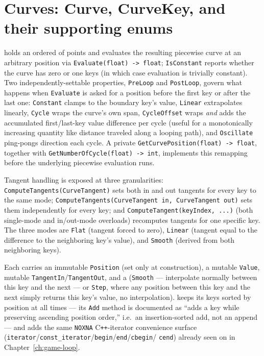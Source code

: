 \section{Curves: Curve, CurveKey, and their supporting enums}

 holds an ordered  of  points
and evaluates the resulting piecewise curve at an arbitrary position via
\texttt{Evaluate(float) -> float}; \texttt{IsConstant} reports whether the curve has zero or
one keys (in which case evaluation is trivially constant). Two independently-settable
 properties, \texttt{PreLoop} and \texttt{PostLoop}, govern what
happens when \texttt{Evaluate} is asked for a position before the first key or after the
last one: \texttt{Constant} clamps to the boundary key's value, \texttt{Linear} extrapolates
linearly, \texttt{Cycle} wraps the curve's own span, \texttt{CycleOffset} wraps \emph{and}
adds the accumulated first/last-key value difference per cycle (useful for a monotonically
increasing quantity like distance traveled along a looping path), and \texttt{Oscillate}
ping-pongs direction each cycle. A private \texttt{GetCurvePosition(float) -> float},
together with \texttt{GetNumberOfCycle(float) -> int}, implements this remapping before the
underlying piecewise evaluation runs.

Tangent handling is exposed at three granularities: \texttt{ComputeTangents(CurveTangent)}
sets both in and out tangents for every key to the same  mode;
\texttt{ComputeTangents(CurveTangent in, CurveTangent out)} sets them independently for every
key; and \texttt{ComputeTangent(keyIndex, ...)} (both single-mode and in/out-mode overloads)
recomputes tangents for one specific key. The three  modes are
\texttt{Flat} (tangent forced to zero), \texttt{Linear} (tangent equal to the difference to
the neighboring key's value), and \texttt{Smooth} (derived from both neighboring keys).

Each  carries an immutable \texttt{Position} (set only at construction),
a mutable \texttt{Value}, mutable \texttt{TangentIn}/\texttt{TangentOut}, and a
 (\texttt{Smooth} --- interpolate normally between this key and the
next --- or \texttt{Step}, where any position between this key and the next simply returns
this key's value, no interpolation).  keeps its keys sorted by
position at all times --- its \texttt{Add} method is documented as ``adds a key while
preserving ascending position order,'' i.e.\ an insertion-sorted add, not an append --- and
adds the same \texttt{NOXNA} C\texttt{++}-iterator convenience surface
(\texttt{iterator}/\texttt{const\_iterator}/\texttt{begin}/\texttt{end}/\texttt{cbegin}/%
\texttt{cend}) already seen on  in
Chapter~\ref{ch:game-loop}.

